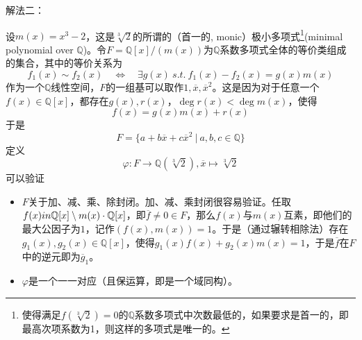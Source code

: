 解法二：

设$m(x) = x^3 - 2$，这是$\sqrt[3]{2}$的所谓的（首一的, monic）极小多项式\footnote{使得满足$f(\sqrt[3]{2})=0$的$\mathbb{Q}$系数多项式中次数最低的，如果要求是首一的，即最高次项系数为1，则这样的多项式是唯一的。}(minimal polynomial over $\mathbb{Q}$)。令$F = \mathbb{Q}[x] / (m(x))$为$\mathbb{Q}$系数多项式全体的等价类组成的集合，其中的等价关系为
$$f_1(x) \sim f_2(x) \quad \Longleftrightarrow \quad \exists g(x) \ s.t.\ f_1(x)-f_2(x) = g(x)m(x)$$
作为一个$\mathbb{Q}$线性空间，$F$的一组基可以取作$1, \overline{x}, \overline{x}^2$。这是因为对于任意一个$f(x) \in \mathbb{Q}[x]$，都存在$g(x), r(x)$，$\deg r(x) < \deg m(x)$，使得
$$f(x) = g(x)m(x) + r(x)$$
于是
$$F = \{ a + b\overline{x} + c\overline{x}^2 \ |\ a,b,c\in\mathbb{Q} \}$$
定义
$$\varphi : F \to \mathbb{Q}(\sqrt[3]{2}), \overline{x} \mapsto \sqrt[3]{2}$$
可以验证
\begin{itemize}
    \item $F$关于加、减、乘、除封闭。加、减、乘封闭很容易验证。任取$f(x)\\in \mathbb{Q}[x] \setminus m(x)\cdot\mathbb{Q}[x]$，即$\overline{f} \neq 0 \in F$，那么$f(x)$与$m(x)$互素，即他们的最大公因子为$1$，记作$(f(x), m(x)) = 1$。于是（通过辗转相除法）存在$g_1(x), g_2(x) \in \mathbb{Q}[x]$，使得$g_1(x)f(x) + g_2(x)m(x) = 1$，于是$\overline{f}$在$F$中的逆元即为$\overline{g}_1$。
    \item $\varphi$是一个一一对应（且保运算，即是一个域同构）。
\end{itemize}




